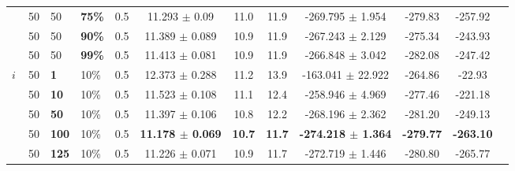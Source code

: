 \begin{sidewaystable}
\begin{tabular}{|l|l|l|l|l||c|c|c|c|c|c|c|}
    ~ & 50 & 50 & \textbf{75\%} & 0.5  & 11.293 $\pm$ 0.09 & 11.0 & 11.9 & -269.795 $\pm$ 1.954 & -279.83 & -257.92 \\
    ~ & 50 & 50 & \textbf{90\%} & 0.5  & 11.389 $\pm$ 0.089 & 10.9 & 11.9 & -267.243 $\pm$ 2.129 & -275.34 & -243.93 \\
    ~ & 50 & 50 & \textbf{99\%} & 0.5  & 11.413 $\pm$ 0.081 & 10.9 & 11.9 & -266.848 $\pm$ 3.042 & -282.08 & -247.42  \\
    \hline
    $i$ & 50 & \textbf{1} & 10\% & 0.5  & 12.373 $\pm$ 0.288 & 11.2 & 13.9& -163.041 $\pm$ 22.922 & -264.86 & -22.93  \\
    ~   & 50 &\textbf{10} & 10\% & 0.5  & 11.523 $\pm$ 0.108 & 11.1 & 12.4 & -258.946 $\pm$ 4.969 & -277.46& -221.18 \\
    ~   & 50 &\textbf{50} & 10\% & 0.5  & 11.397 $\pm$ 0.106 & 10.8 & 12.2 & -268.196 $\pm$ 2.362 & -281.20 & -249.13 \\
    ~   & 50 &\textbf{100} & 10\% & 0.5 & \textbf{11.178 $\pm$ 0.069} & \textbf{10.7} & \textbf{11.7} & \textbf{-274.218 $\pm$ 1.364} & \textbf{-279.77} & \textbf{-263.10} \\
    ~   & 50 &\textbf{125} & 10\% & 0.5 & 11.226 $\pm$ 0.071 & 10.9 & 11.7 & -272.719 $\pm$ 1.446 & -280.80 & -265.77  \\

\end{tabular}
\end{sidewaystable}
